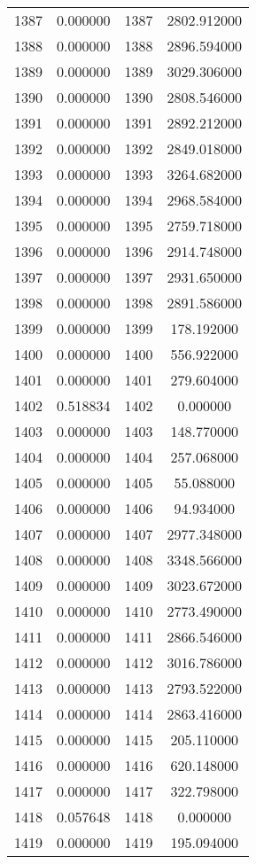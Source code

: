 \documentclass[12pt]{article}
\begin{document}
\begin{longtable}{@{}cccc@{}}
1387 & 0.000000 & 1387 & 2802.912000 \\
1388 & 0.000000 & 1388 & 2896.594000 \\
1389 & 0.000000 & 1389 & 3029.306000 \\
1390 & 0.000000 & 1390 & 2808.546000 \\
1391 & 0.000000 & 1391 & 2892.212000 \\
1392 & 0.000000 & 1392 & 2849.018000 \\
1393 & 0.000000 & 1393 & 3264.682000 \\
1394 & 0.000000 & 1394 & 2968.584000 \\
1395 & 0.000000 & 1395 & 2759.718000 \\
1396 & 0.000000 & 1396 & 2914.748000 \\
1397 & 0.000000 & 1397 & 2931.650000 \\
1398 & 0.000000 & 1398 & 2891.586000 \\
1399 & 0.000000 & 1399 & 178.192000 \\
1400 & 0.000000 & 1400 & 556.922000 \\
1401 & 0.000000 & 1401 & 279.604000 \\
1402 & 0.518834 & 1402 & 0.000000 \\
1403 & 0.000000 & 1403 & 148.770000 \\
1404 & 0.000000 & 1404 & 257.068000 \\
1405 & 0.000000 & 1405 & 55.088000 \\
1406 & 0.000000 & 1406 & 94.934000 \\
1407 & 0.000000 & 1407 & 2977.348000 \\
1408 & 0.000000 & 1408 & 3348.566000 \\
1409 & 0.000000 & 1409 & 3023.672000 \\
1410 & 0.000000 & 1410 & 2773.490000 \\
1411 & 0.000000 & 1411 & 2866.546000 \\
1412 & 0.000000 & 1412 & 3016.786000 \\
1413 & 0.000000 & 1413 & 2793.522000 \\
1414 & 0.000000 & 1414 & 2863.416000 \\
1415 & 0.000000 & 1415 & 205.110000 \\
1416 & 0.000000 & 1416 & 620.148000 \\
1417 & 0.000000 & 1417 & 322.798000 \\
1418 & 0.057648 & 1418 & 0.000000 \\
1419 & 0.000000 & 1419 & 195.094000 \\

\end{longtable}
\end{document}
